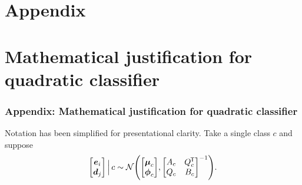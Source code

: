 \documentclass[8pt]{beamer}
\theoremstyle{definition}
\theoremstyle{plain}
\theoremstyle{definition}
\theoremstyle{remark}
\numberwithin{equation}{section}
\numberwithin{figure}{section}
\numberwithin{table}{section}
\newcommand*{\tran}{^{\mkern-1.5mu\mathsf{T}}}
\begin{document}
\section{Appendix}

\appendix

\section{Mathematical justification for quadratic classifier}
\begin{frame}
    \frametitle{Appendix: Mathematical justification for quadratic classifier}
    Notation has been simplified for presentational clarity. Take a single class \(c\) and suppose
    \[
        \mqty[\boldsymbol{e}_{i} \\ \boldsymbol{d}_{j}] \, \Big| \, c \sim \mathcal{N}\qty(\mqty[\boldsymbol{\mu}_{c} \\ \boldsymbol{\phi}_{c}], \mqty[A_{c} & Q_{c} \tran \\ Q_{c} & B_{c}]^{-1}).
    \]
    

\end{frame}
\end{document}

